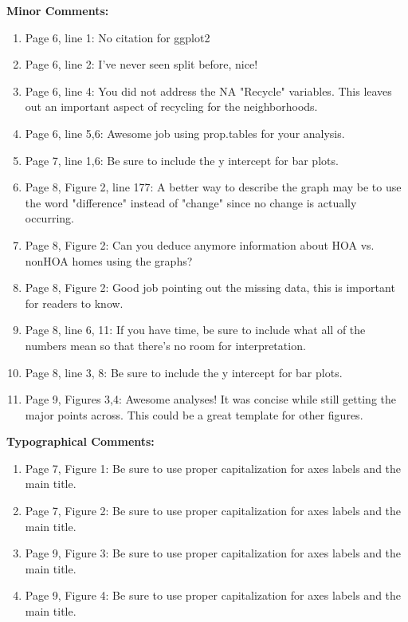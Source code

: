 \documentclass{article}
\begin{document}
\textbf{Minor Comments:} 
\begin{enumerate}
  \item Page 6, line 1: No citation for ggplot2
  \item Page 6, line 2: I've never seen split before, nice!
  \item Page 6, line 4: You did not address the NA "Recycle" variables. This leaves out an important aspect of recycling for the neighborhoods.
  \item Page 6, line 5,6: Awesome job using prop.tables for your analysis.
  \item Page 7, line 1,6: Be sure to include the y intercept for bar plots. 
  \item Page 8, Figure 2, line 177: A better way to describe the graph may be to use the word "difference" instead of "change" since no change is actually occurring. 
  \item Page 8, Figure 2: Can you deduce anymore information about HOA vs. nonHOA homes using the graphs?
  \item Page 8, Figure 2: Good job pointing out the missing data, this is important for readers to know. 
  \item Page 8, line 6, 11: If you have time, be sure to include what all of the numbers mean so that there's no room for interpretation. 
  \item Page 8, line 3, 8: Be sure to include the y intercept for bar plots. 
  \item Page 9, Figures 3,4: Awesome analyses! It was concise while still getting the major points across. This could be a great template for other figures. 
\end{enumerate}

\textbf{Typographical Comments:} 
\begin{enumerate}
  \item Page 7, Figure 1: Be sure to use proper capitalization for axes labels and the main title.
  \item Page 7, Figure 2: Be sure to use proper capitalization for axes labels and the main title.
  \item Page 9, Figure 3: Be sure to use proper capitalization for axes labels and the main title.
  \item Page 9, Figure 4: Be sure to use proper capitalization for axes labels and the main title.
\end{enumerate}
\end{document}
